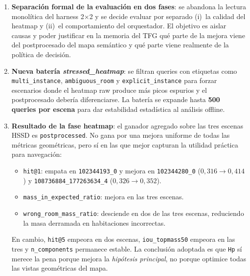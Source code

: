 \begin{enumerate}

  \item \textbf{Separación formal de la evaluación en dos fases}: se abandona
        la lectura monolítica del harness 2$\times$2 y se decide evaluar por
        separado (i)~la calidad del heatmap y (ii)~el comportamiento del
        orquestador. El objetivo es aislar causas y poder justificar en la
        memoria del TFG qué parte de la mejora viene del postprocesado del mapa
        semántico y qué parte viene realmente de la política de decisión.

  \item \textbf{Nueva batería \emph{stressed\_heatmap}}: se filtran queries con
        etiquetas como \texttt{multi\_instance}, \texttt{ambiguous\_room} y
        \texttt{explicit\_instance} para forzar escenarios donde el heatmap raw
        produce más picos espurios y el postprocesado debería diferenciarse.
        La batería se expande hasta \textbf{500 queries por escena} para dar
        estabilidad estadística al análisis offline.

  \item \textbf{Resultado de la fase heatmap}: el ganador agregado sobre las
        tres escenas HSSD es \texttt{postprocessed}. No gana por una mejora
        uniforme de todas las métricas geométricas, pero sí en las que mejor
        capturan la utilidad práctica para navegación:
        \begin{itemize}
          \item \texttt{hit@1}: empata en \texttt{102344193\_0} y mejora en
                \texttt{102344280\_0} ($0{,}316 \rightarrow 0{,}414$) y
                \texttt{108736884\_177263634\_4}
                ($0{,}326 \rightarrow 0{,}352$).
          \item \texttt{mass\_in\_expected\_ratio}: mejora en las tres escenas.
          \item \texttt{wrong\_room\_mass\_ratio}: desciende en dos de las tres
                escenas, reduciendo la masa derramada en habitaciones
                incorrectas.
        \end{itemize}
        En cambio, \texttt{hit@5} empeora en dos escenas,
        \texttt{iou\_topmass50} empeora en las tres y
        \texttt{n\_components} permanece estable. La conclusión adoptada es que
        \texttt{Hp} sí merece la pena porque mejora la \emph{hipótesis
        principal}, no porque optimice todas las vistas geométricas del mapa.


\end{enumerate}
